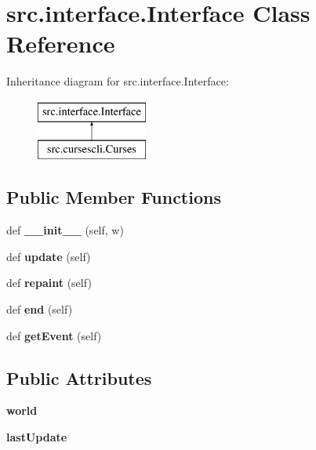 \hypertarget{classsrc_1_1interface_1_1_interface}{}\section{src.\+interface.\+Interface Class Reference}
\label{classsrc_1_1interface_1_1_interface}
Inheritance diagram for src.\+interface.\+Interface\+:\begin{figure}[H]
\begin{center}
\leavevmode
\includegraphics[height=2.000000cm]{classsrc_1_1interface_1_1_interface}
\end{center}
\end{figure}
\subsection*{Public Member Functions}
\begin{DoxyCompactItemize}
\item 
\hypertarget{classsrc_1_1interface_1_1_interface_afd85ca0e9d4d7241eb7cc3fc278e382e}{}\label{classsrc_1_1interface_1_1_interface_afd85ca0e9d4d7241eb7cc3fc278e382e} 
def {\bfseries \+\_\+\+\_\+init\+\_\+\+\_\+} (self, w)
\item 
\hypertarget{classsrc_1_1interface_1_1_interface_a208bd509d61790c767cf2e2e244251e6}{}\label{classsrc_1_1interface_1_1_interface_a208bd509d61790c767cf2e2e244251e6} 
def {\bfseries update} (self)
\item 
\hypertarget{classsrc_1_1interface_1_1_interface_a568bdcd1f15799b98e7fddd66e53538a}{}\label{classsrc_1_1interface_1_1_interface_a568bdcd1f15799b98e7fddd66e53538a} 
def {\bfseries repaint} (self)
\item 
\hypertarget{classsrc_1_1interface_1_1_interface_a7220f63d562c2a8eb934f8a7233fd326}{}\label{classsrc_1_1interface_1_1_interface_a7220f63d562c2a8eb934f8a7233fd326} 
def {\bfseries end} (self)
\item 
\hypertarget{classsrc_1_1interface_1_1_interface_aae4bd8e4081596c5dec5013aed5c8ac0}{}\label{classsrc_1_1interface_1_1_interface_aae4bd8e4081596c5dec5013aed5c8ac0} 
def {\bfseries get\+Event} (self)
\end{DoxyCompactItemize}
\subsection*{Public Attributes}
\begin{DoxyCompactItemize}
\item 
\hypertarget{classsrc_1_1interface_1_1_interface_ae3f574913c0f42acfe8869b6f1b53f97}{}\label{classsrc_1_1interface_1_1_interface_ae3f574913c0f42acfe8869b6f1b53f97} 
{\bfseries world}
\item 
\hypertarget{classsrc_1_1interface_1_1_interface_a6841bfb944d99e869903790a57cd57ab}{}\label{classsrc_1_1interface_1_1_interface_a6841bfb944d99e869903790a57cd57ab} 
{\bfseries last\+Update}
\end{DoxyCompactItemize}


